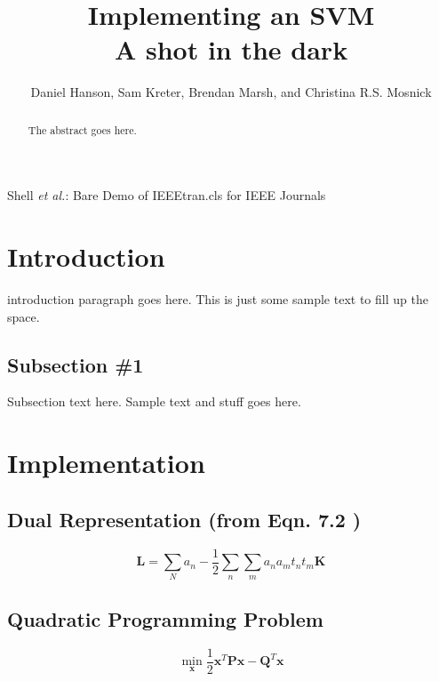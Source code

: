 \documentclass[journal]{IEEEtran}
\begin{document}
\title{Implementing an SVM\\ A shot in the dark}

\author{Daniel Hanson, Sam Kreter, Brendan Marsh, and Christina R.S. Mosnick}

{Shell \MakeLowercase{\textit{et al.}}: Bare Demo of IEEEtran.cls for IEEE Journals}

\maketitle

\begin{abstract}
The abstract goes here.
\end{abstract}

\IEEEpeerreviewmaketitle

\section{Introduction}

 introduction paragraph goes here. This is just some sample text to fill up the space.



\subsection{Subsection \#1}
Subsection text here. Sample text and stuff goes here.

\section{Implementation}
    \subsection{Dual Representation (from Eqn. 7.2 \cite{BishopBook})}
    \begin{equation}
    \mathbf{L} = \sum\limits_{N} a_n - \frac{1}{2} \sum\limits_{n} \sum\limits_{m} a_n a_m t_n t_m \mathbf{K}
    \end{equation}

    \subsection{Quadratic Programming Problem \cite{QuadraticCVXOPT}}
    \begin{equation}
    \min_{\mathbf{x}} \frac{1}{2}\mathbf{x}^T\mathbf{P}\mathbf{x} - \mathbf{Q}^T\mathbf{x}
    \end{equation}
\end{document}
